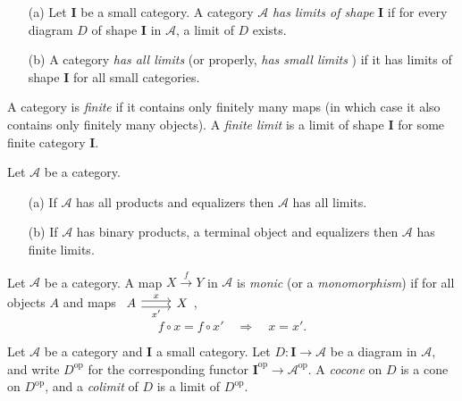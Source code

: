 \begin{definition}
  \begin{enumerate}
    \item [(a)] Let $\mathbf{I}$ be a small category. A category $\mathscr{A}$ \textit{has limits of shape} $\mathbf{I}$ if for every diagram $D$ of shape $\mathbf{I}$ in $\mathscr{A}$, a limit of $D$ exists.
    \item [(b)] A category \textit{has all limits} (or properly, \textit{has small limits} ) if it has limits of shape $\mathbf{I}$ for all small categories.
  \end{enumerate}
\end{definition}

\begin{definition}
  A category is \textit{finite} if it contains only finitely many maps (in which case it also contains only finitely many objects). A \textit{finite limit} is a limit of shape $\mathbf{I}$ for some finite category $\mathbf{I}$. 
\end{definition}

\begin{proposition}
  Let $\mathscr{A}$ be a category.
  \begin{enumerate}
    \item [\rm{(a)}] If $\mathscr{A}$ has all products and equalizers then $\mathscr{A}$ has all limits.
    \item [\rm{(b)}] If $\mathscr{A}$ has binary products, a terminal object and equalizers then $\mathscr{A}$ has finite limits.
  \end{enumerate}
\end{proposition}

\begin{definition}
  Let $\mathscr{A}$ be a category. A map $X\xrightarrow{f} Y$ in $\mathscr{A}$ is \textit{monic} (or a \textit{monomorphism}) if for all objects $A$ and maps $
  \begin{tikzcd}
    A\arrow[r,shift left,"x"] \arrow[r,shift right, "x'"'] &X
  \end{tikzcd}$,
  \[
  f\circ x=f\circ x'\quad \Longrightarrow\quad x=x'.
  \] 
\end{definition}

\begin{definition}
  Let $\mathscr{A}$ be a category and $\mathbf{I}$ a small category. Let $D:\mathbf{I}\to \mathscr{A}$ be a diagram in $\mathscr{A}$, and write $D^{\mathrm{op}}$ for the corresponding functor $\mathbf{I}^{\mathrm{op}}\to \mathscr{A}^{\mathrm{op}}$. A \textit{cocone} on $D$ is a cone on $D^{\mathrm{op}}$, and a \textit{colimit} of $D$ is a limit of $D^{\mathrm{op}}$.
\end{definition}

